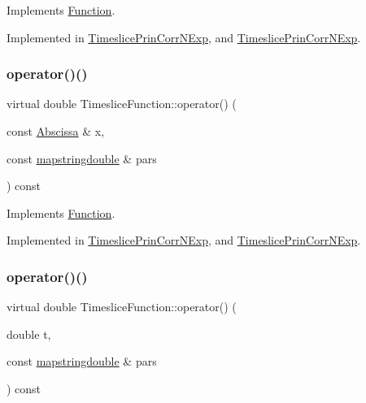 Implements \mbox{\hyperlink{classFunction_a8cd7f815d5f883cc523341c53ba811d0}{Function}}.



Implemented in \mbox{\hyperlink{classTimeslicePrinCorrNExp_a9a55af8256beba8993e5163bdab55571}{Timeslice\+Prin\+Corr\+N\+Exp}}, and \mbox{\hyperlink{classTimeslicePrinCorrNExp_a9a55af8256beba8993e5163bdab55571}{Timeslice\+Prin\+Corr\+N\+Exp}}.

\mbox{\label{classTimesliceFunction_ac4426035b36872933c70b5e0ad8cb4e3}} 
\subsubsection{\texorpdfstring{operator()()}{operator()()}\hspace{0.1cm}{\footnotesize\ttfamily [2/4]}}
{\footnotesize\ttfamily virtual double Timeslice\+Function\+::operator() (\begin{DoxyParamCaption}\item[{const \mbox{\hyperlink{classAbscissa}{Abscissa}} \&}]{x,  }\item[{const \mbox{\hyperlink{lib_2fitting__lib_2includes_8h_a647b481c557c7966517f753340a81d13}{mapstringdouble}} \&}]{pars }\end{DoxyParamCaption}) const\hspace{0.3cm}{\ttfamily [pure virtual]}}



Implements \mbox{\hyperlink{classFunction_a8cd7f815d5f883cc523341c53ba811d0}{Function}}.



Implemented in \mbox{\hyperlink{classTimeslicePrinCorrNExp_a9a55af8256beba8993e5163bdab55571}{Timeslice\+Prin\+Corr\+N\+Exp}}, and \mbox{\hyperlink{classTimeslicePrinCorrNExp_a9a55af8256beba8993e5163bdab55571}{Timeslice\+Prin\+Corr\+N\+Exp}}.

\mbox{\label{classTimesliceFunction_a0a71b38a0008247e9ed3726b466132c3}} 
\subsubsection{\texorpdfstring{operator()()}{operator()()}\hspace{0.1cm}{\footnotesize\ttfamily [3/4]}}
{\footnotesize\ttfamily virtual double Timeslice\+Function\+::operator() (\begin{DoxyParamCaption}\item[{double}]{t,  }\item[{const \mbox{\hyperlink{lib_2fitting__lib_2includes_8h_a647b481c557c7966517f753340a81d13}{mapstringdouble}} \&}]{pars }\end{DoxyParamCaption}) const\hspace{0.3cm}{\ttfamily [pure virtual]}}



